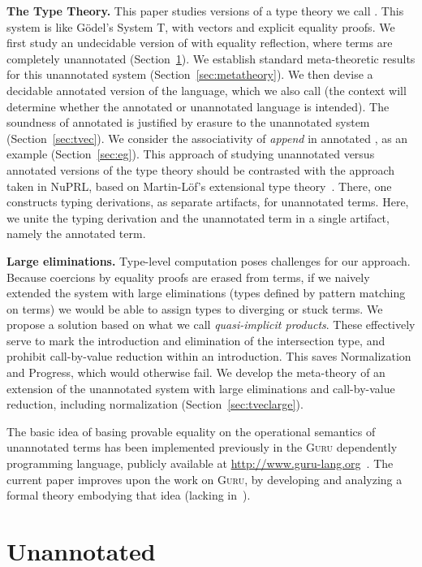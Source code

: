 \documentclass[copyright]{eptcs}
\begin{document}
\textbf{The  Type Theory.} This paper studies versions of a
type theory we call .  This system is like G\"odel's System T,
with vectors and explicit equality proofs.  We first study an
undecidable version of  with equality reflection, where terms
are completely unannotated (Section~\ref{sec:core}).  We establish
standard meta-theoretic results for this unannotated system
(Section~\ref{sec:metatheory}).  We then devise a decidable annotated
version of the language, which we also call  (the context will
determine whether the annotated or unannotated language is intended).
The soundness of annotated  is justified by erasure to the
unannotated system (Section~\ref{sec:tvec}).  We consider the
associativity of \textit{append} in annotated , as an example
(Section~\ref{sec:eg}).  This approach of studying unannotated versus
annotated versions of the type theory should be contrasted with the
approach taken in NuPRL, based on Martin-L\"of's extensional type
theory~\cite{C86,ml84}.  There, one constructs typing derivations, as
separate artifacts, for unannotated terms.  Here, we unite the typing
derivation and the unannotated term in a single artifact, namely the
annotated term.

\textbf{Large eliminations.} Type-level computation poses challenges
for our approach.  Because coercions by equality proofs are erased
from terms, if we naively extended the system with large eliminations
(types defined by pattern matching on terms) we would be able
to assign types to diverging or stuck terms. We propose a solution
based on what we call \emph{quasi-implicit products}.  These
effectively serve to mark the introduction and elimination of the
intersection type, and prohibit call-by-value reduction within an
introduction.  This saves Normalization and Progress, which would
otherwise fail.  We develop the meta-theory of an extension of the
unannotated system with large eliminations and call-by-value
reduction, including normalization (Section~\ref{sec:tveclarge}).

The basic idea of basing provable equality on the operational
semantics of unannotated terms has been implemented previously in the
\textsc{Guru} dependently programming language, publicly available at
\url{http://www.guru-lang.org}~\cite{guru09}.  The current paper
improves upon the work on \textsc{Guru}, by developing and analyzing a
formal theory embodying that idea (lacking in~\cite{guru09}).

\section{Unannotated }
\label{sec:core}
\end{document}
